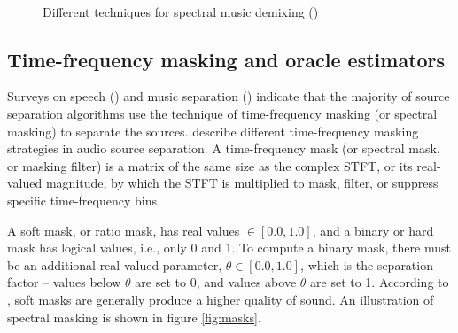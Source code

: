 \documentclass[report.tex]{subfiles}
\begin{document}
\begin{figure}[ht]
	\centering
	\\
	\caption{Different techniques for spectral music demixing (\cite{musicsepgood})}
	\label{fig:spectraldemix}
\end{figure}

\newpagefill

\subsection{Time-frequency masking and oracle estimators}
\label{sec:masksandoracles}

Surveys on speech (\cite{speechmask}) and music separation (\cite{musicmask}) indicate that the majority of source separation algorithms use the technique of time-frequency masking (or spectral masking) to separate the sources.  \textcite{masking} describe different time-frequency masking strategies in audio source separation. A time-frequency mask (or spectral mask, or masking filter) is a matrix of the same size as the complex STFT, or its real-valued magnitude, by which the STFT is multiplied to mask, filter, or suppress specific time-frequency bins.

A soft mask, or ratio mask, has real values $\in [0.0, 1.0]$, and a binary or hard mask has logical values, i.e., only 0 and 1. To compute a binary mask, there must be an additional real-valued parameter, $\theta \in [0.0, 1.0]$, which is the separation factor -- values below $\theta$ are set to 0, and values above $\theta$ are set to 1. According to \textcite{masking}, soft masks are generally produce a higher quality of sound. An illustration of spectral masking is shown in figure \ref{fig:masks}.
\end{document}
